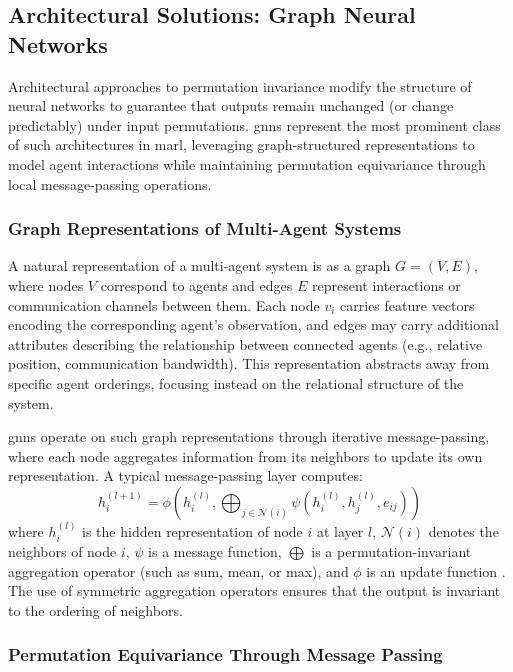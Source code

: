 \subsection{Architectural Solutions: Graph Neural Networks}
\label{sec:gnn-solutions}

Architectural approaches to permutation invariance modify the
structure of neural networks to guarantee that outputs remain
unchanged (or change predictably) under input permutations.
\Glspl{gnn} represent the most prominent class of such
architectures in \gls{marl}, leveraging graph-structured
representations to model agent interactions while maintaining
permutation equivariance through local message-passing operations.

\subsubsection{Graph Representations of Multi-Agent Systems}

A natural representation of a multi-agent system is as a graph
$G = (V, E)$, where nodes $V$ correspond to agents and edges $E$
represent interactions or communication channels between them.
Each node $v_i$ carries feature vectors encoding the corresponding
agent's observation, and edges may carry additional attributes
describing the relationship between connected agents (e.g.,
relative position, communication bandwidth). This representation
abstracts away from specific agent orderings, focusing instead
on the relational structure of the system.

\Glspl{gnn} operate on such graph representations through
iterative message-passing, where each node aggregates information
from its neighbors to update its own representation. A typical
message-passing layer computes:
\begin{equation}
    h_i^{(l+1)} = \phi\left( h_i^{(l)}, \bigoplus_{j \in \mathcal{N}(i)} \psi(h_i^{(l)}, h_j^{(l)}, e_{ij}) \right)
\end{equation}
where $h_i^{(l)}$ is the hidden representation of node $i$ at
layer $l$, $\mathcal{N}(i)$ denotes the neighbors of node $i$,
$\psi$ is a message function, $\bigoplus$ is a permutation-invariant
aggregation operator (such as sum, mean, or max), and $\phi$ is
an update function \cite{zambaldi2018}. The use of symmetric
aggregation operators ensures that the output is invariant to
the ordering of neighbors.

\subsubsection{Permutation Equivariance Through Message Passing}

